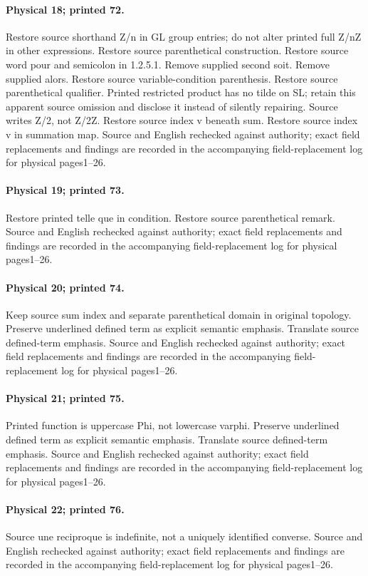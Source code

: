 \documentclass[10pt,a4paper]{article}
\begin{document}
\paragraph{Physical 18; printed 72.} Restore source shorthand Z/n in GL group entries; do not alter printed full Z/nZ in other expressions. Restore source parenthetical construction. Restore source word pour and semicolon in 1.2.5.1. Remove supplied second soit. Remove supplied alors. Restore source variable-condition parenthesis. Restore source parenthetical qualifier. Printed restricted product has no tilde on SL; retain this apparent source omission and disclose it instead of silently repairing. Source writes Z/2, not Z/2Z. Restore source index v beneath sum. Restore source index v in summation map. Source and English rechecked against authority; exact field replacements and findings are recorded in the accompanying field-replacement log for physical pages1--26.
\paragraph{Physical 19; printed 73.} Restore printed telle que in condition. Restore source parenthetical remark. Source and English rechecked against authority; exact field replacements and findings are recorded in the accompanying field-replacement log for physical pages1--26.
\paragraph{Physical 20; printed 74.} Keep source sum index and separate parenthetical domain in original topology. Preserve underlined defined term as explicit semantic emphasis. Translate source defined-term emphasis. Source and English rechecked against authority; exact field replacements and findings are recorded in the accompanying field-replacement log for physical pages1--26.
\paragraph{Physical 21; printed 75.} Printed function is uppercase Phi, not lowercase varphi. Preserve underlined defined term as explicit semantic emphasis. Translate source defined-term emphasis. Source and English rechecked against authority; exact field replacements and findings are recorded in the accompanying field-replacement log for physical pages1--26.
\paragraph{Physical 22; printed 76.} Source une reciproque is indefinite, not a uniquely identified converse. Source and English rechecked against authority; exact field replacements and findings are recorded in the accompanying field-replacement log for physical pages1--26.
\end{document}
